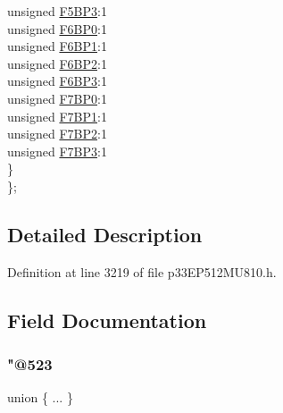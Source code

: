 \begin{DoxyCompactItemize}
\begin{tabbing}
\>\>unsigned \hyperlink{structtag_c1_b_u_f_p_n_t2_b_i_t_s_acfb3fca097b38fb9e51082d6e3865248}{F5BP3}:1\\
\>\>unsigned \hyperlink{structtag_c1_b_u_f_p_n_t2_b_i_t_s_aec8e4fb99afcab3a5656cf959efb6364}{F6BP0}:1\\
\>\>unsigned \hyperlink{structtag_c1_b_u_f_p_n_t2_b_i_t_s_a34aae39036218f34dc4a663e951478b0}{F6BP1}:1\\
\>\>unsigned \hyperlink{structtag_c1_b_u_f_p_n_t2_b_i_t_s_ac4317c346de93de2215fb30889ccbdf1}{F6BP2}:1\\
\>\>unsigned \hyperlink{structtag_c1_b_u_f_p_n_t2_b_i_t_s_af6530b53f38940ff3be1b259acb5bf30}{F6BP3}:1\\
\>\>unsigned \hyperlink{structtag_c1_b_u_f_p_n_t2_b_i_t_s_a9d85c4e73be55e0e406f1c245fba554c}{F7BP0}:1\\
\>\>unsigned \hyperlink{structtag_c1_b_u_f_p_n_t2_b_i_t_s_a783c11bf9aac73fbf977be6ebd21dcd5}{F7BP1}:1\\
\>\>unsigned \hyperlink{structtag_c1_b_u_f_p_n_t2_b_i_t_s_ad17ad8a4e0bdc19525382cdbd924ad5c}{F7BP2}:1\\
\>\>unsigned \hyperlink{structtag_c1_b_u_f_p_n_t2_b_i_t_s_aad9539f9fb073db359d4b0c4ec752456}{F7BP3}:1\\
\>\} \\
\}; \\

\end{tabbing}\end{DoxyCompactItemize}


\subsection{Detailed Description}


Definition at line 3219 of file p33\+E\+P512\+M\+U810.\+h.



\subsection{Field Documentation}
\mbox{\label{structtag_c1_b_u_f_p_n_t2_b_i_t_s_a69cb5e8a643ffcaa16e0e39567500cbb}} 
\subsubsection{\texorpdfstring{"@523}{@523}}
{\footnotesize\ttfamily union \{ ... \} }

